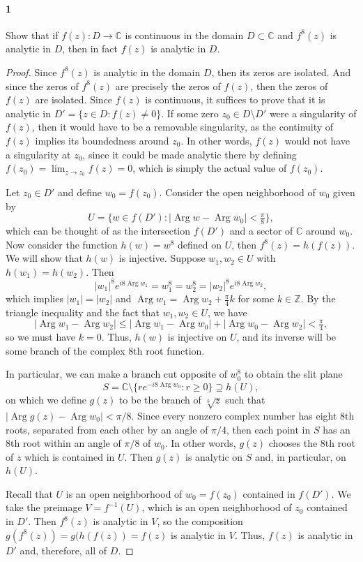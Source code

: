 \documentclass[12pt]{article}
\newenvironment{fullbox}{\begin{lrbox}{\savefullbox}\begin{minipage}{\dimexpr\textwidth-2\fboxsep\relax}}{\end{minipage}\end{lrbox}\begin{center}\framebox[\textwidth]{\usebox{\savefullbox}}\end{center}}
\newenvironment{pbox}[1][]{\begin{fullbox}\ifx#1\empty\else\paragraph{#1}\fi}{\end{fullbox}}
\theoremstyle{definition}
\newcommand{\Z}{\mathbb{Z}}
\newcommand{\C}{\mathbb{C}}
\newcommand{\Arg}{\operatorname{Arg}}
\begin{document}
\thispagestyle{title}


\begin{pbox}[1]
    Show that if $f(z) : D \to \C$ is continuous in the domain $D \subset \C$ and $f^8(z)$ is analytic in $D$, then in fact $f(z)$ is analytic in $D$.
\end{pbox}

\begin{proof}
    Since $f^8(z)$ is analytic in the domain $D$, then its zeros are isolated. And since the zeros of $f^8(z)$ are precisely the zeros of $f(z)$, then the zeros of $f(z)$ are isolated. Since $f(z)$ is continuous, it suffices to prove that it is analytic in $D' = \{z \in D : f(z) \ne 0\}$. If some zero $z_0 \in D \setminus D'$ were a singularity of $f(z)$, then it would have to be a removable singularity, as the continuity of $f(z)$ implies its boundedness around $z_0$. In other words, $f(z)$ would not have a singularity at $z_0$, since it could be made analytic there by defining $f(z_0) = \lim_{z\to z_0} f(z) = 0$, which is simply the actual value of $f(z_0)$.
    
    Let $z_0 \in D'$ and define $w_0 = f(z_0)$. Consider the open neighborhood of $w_0$ given by
    \[
        U =  \{w \in f(D') : |\Arg w - \Arg w_0| < \tfrac{\pi}{8}\},
    \]
    which can be thought of as the intersection $f(D')$ and a sector of $\C$ around $w_0$. Now consider the function $h(w) = w^8$ defined on $U$, then $f^8(z) = h(f(z))$. We will show that $h(w)$ is injective. Suppose $w_1, w_2 \in U$ with $h(w_1) = h(w_2)$. Then
    \[
        |w_1|^8e^{i8\Arg w_1} = w_1^8 = w_2^8 = |w_2|^8e^{i8\Arg w_2}, 
    \]
    which implies $|w_1| = |w_2|$ and $\Arg w_1 = \Arg w_2 + \frac{\pi}{4}k$ for some $k \in \Z$. By the triangle inequality and the fact that $w_1, w_2 \in U$, we have
    \[
        |\Arg w_1 - \Arg w_2| \leq |\Arg w_1 - \Arg w_0| + |\Arg w_0 - \Arg w_2| < \tfrac{\pi}{4},
    \]
    so we must have $k = 0$. Thus, $h(w)$ is injective on $U$, and its inverse will be some branch of the complex $8$th root function.
    
    In particular, we can make a branch cut opposite of $w_0^8$ to obtain the slit plane
    \[
        S = \C \setminus \{re^{-i8\Arg w_0} : r \geq 0\} \supseteq h(U),
    \]
    on which we define $g(z)$ to be the branch of $\sqrt[8]{z}$ such that $|\Arg g(z) - \Arg w_0| < \pi/8$. Since every nonzero complex number has eight $8$th roots, separated from each other by an angle of $\pi/4$, then each point in $S$ has an $8$th root within an angle of $\pi/8$ of $w_0$. In other words, $g(z)$ chooses the $8$th root of $z$ which is contained in $U$. Then $g(z)$ is analytic on $S$ and, in particular, on $h(U)$.
    
    Recall that $U$ is an open neighborhood of $w_0 = f(z_0)$ contained in $f(D')$. We take the preimage $V = f^{-1}(U)$, which is an open neighborhood of $z_0$ contained in $D'$. Then $f^8(z)$ is analytic in $V$, so the composition $g(f^8(z)) = g(h(f(z)) = f(z)$ is analytic in $V$. Thus, $f(z)$ is analytic in $D'$ and, therefore, all of $D$.
    
    
    
\end{proof}
\end{document}
